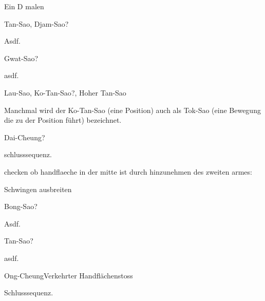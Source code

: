 \begin{WTSatz}{Ein D malen}%

	
	\begin{WTSatzTeil}{Tan-Sao, Djam-Sao}{?}
		
		Asdf.
	\end{WTSatzTeil}
	\begin{WTSatzTeil}{Gwat-Sao}{?}
		
		asdf.
	\end{WTSatzTeil}
	\begin{WTSatzTeil}{Lau-Sao, Ko-Tan-Sao}{?, Hoher Tan-Sao}
		
		Manchmal wird der Ko-Tan-Sao (eine Position) auch als Tok-Sao (eine Bewegung die zu der Position f\"uhrt) bezeichnet.
		
	\end{WTSatzTeil}
	\begin{WTSatzTeil}{Dai-Cheung}{?}
		
		schlusssequenz.
		
		checken ob handflaeche in der mitte ist durch hinzunehmen des zweiten armes:
	\end{WTSatzTeil}
\end{WTSatz}


\begin{WTSatz}{Schwingen ausbreiten}%

	
	\begin{WTSatzTeil}{Bong-Sao}{?}
		
		Asdf.
	\end{WTSatzTeil}
	\begin{WTSatzTeil}{Tan-Sao}{?}
		
		asdf.
	\end{WTSatzTeil}
	\begin{WTSatzTeil}{Ong-Cheung}{Verkehrter Handfl\"achenstoss}
		
		Schlusssequenz.
	\end{WTSatzTeil}
\end{WTSatz}

